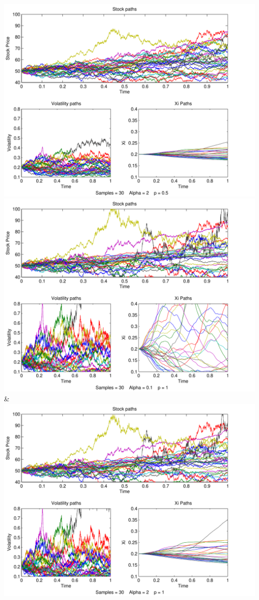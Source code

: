 \documentclass[a4paper,onecolumn]{IEEEtran}
\begin{document}
{			 \includegraphics[width=\stockplotsize]{path_s30_a2_p0-5}\NN\cmidrule(lr){1-2}
		 \includegraphics[width=\stockplotsize]{path_s30_a0-1_p1}&
			 \includegraphics[width=\stockplotsize]{path_s30_a2_p1}\NN\cmidrule(lr){1-2}
}
\end{document}
